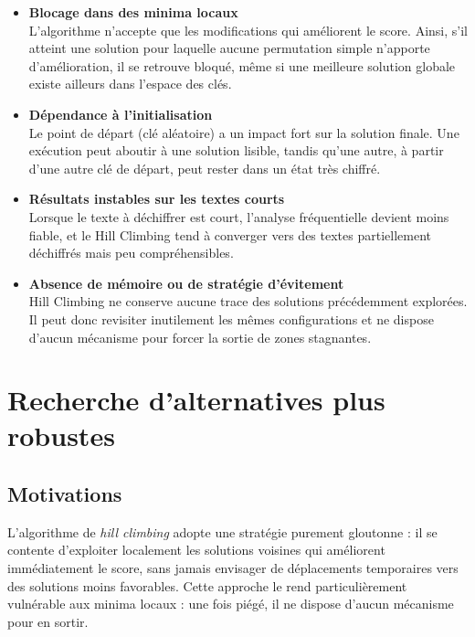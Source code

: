 \documentclass[a4paper]{article}
\begin{document}
\begin{itemize}
    \item \textbf{Blocage dans des minima locaux} \\
    L’algorithme n’accepte que les modifications qui améliorent le score. Ainsi, s’il atteint une solution pour laquelle aucune permutation simple n’apporte d’amélioration, il se retrouve bloqué, même si une meilleure solution globale existe ailleurs dans l’espace des clés.

    \item \textbf{Dépendance à l'initialisation} \\
    Le point de départ (clé aléatoire) a un impact fort sur la solution finale. Une exécution peut aboutir à une solution lisible, tandis qu’une autre, à partir d’une autre clé de départ, peut rester dans un état très chiffré.

    \item \textbf{Résultats instables sur les textes courts} \\
    Lorsque le texte à déchiffrer est court, l’analyse fréquentielle devient moins fiable, et le Hill Climbing tend à converger vers des textes partiellement déchiffrés mais peu compréhensibles.

    \item \textbf{Absence de mémoire ou de stratégie d’évitement} \\
    Hill Climbing ne conserve aucune trace des solutions précédemment explorées. Il peut donc revisiter inutilement les mêmes configurations et ne dispose d’aucun mécanisme pour forcer la sortie de zones stagnantes.
\end{itemize}


\section{Recherche d’alternatives plus robustes}

\subsection{Motivations}

L’algorithme de \textit{hill climbing} adopte une stratégie purement gloutonne : il se contente d’exploiter localement les solutions voisines qui améliorent immédiatement le score, sans jamais envisager de déplacements temporaires vers des solutions moins favorables. Cette approche le rend particulièrement vulnérable aux minima locaux : une fois piégé, il ne dispose d’aucun mécanisme pour en sortir.
\end{document}

